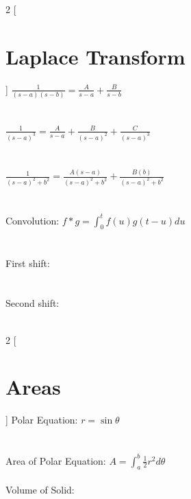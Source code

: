 \documentclass{exam}
\begin{document}
\begin{multicols}{2}
[
\section{Laplace Transform}
]
$\frac{1}{(s-a)(s-b)} = \frac{A}{s-a} + \frac{B}{s-b}$ \\\\\\
$\frac{1}{(s-a)^3} = \frac{A}{s-a} + \frac{B}{(s-a)^2} + \frac{C}{(s-a)^3}$ \\\\\\
$\frac{1}{(s-a)^2+b^2} = \frac{A(s-a)}{(s-a)^2+b^2} + \frac{B(b)}{(s-a)^2+b^2}$ \\\\\\
Convolution: $f * g = \int_0^t f(u)g(t-u)du$\\\\\\
First shift: \\\\\\
Second shift: \\\\
\end{multicols}
\newpage
\begin{multicols}{2}
[
\section{Areas}
]
Polar Equation: $r = \sin\theta$\\\\\\
Area of Polar Equation: $A = \int_a^b \frac{1}{2}r^2d\theta$\\\\
Volume of Solid: \\\\\\
\end{multicols}
\end{document}
